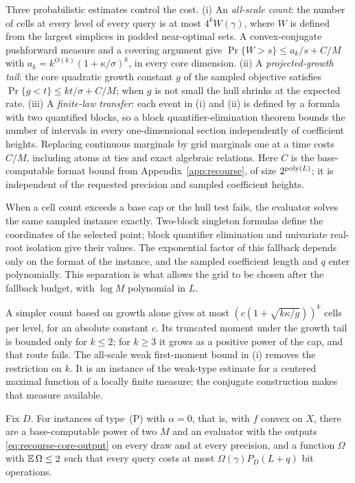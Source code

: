Three probabilistic estimates control the cost. (i) An
\emph{all-scale count}: the number of cells at every level of every
query is at most $4^kW(\gamma)$, where $W$ is defined from the
largest simplices in padded near-optimal sets. A convex-conjugate
pushforward measure and a covering argument give
$\Pr\{W>s\}\le a_k/s+C/M$ with $a_k=k^{O(k)}(1+\kappa/\sigma)^k$, in
every core dimension. (ii) A \emph{projected-growth tail}: the core
quadratic growth constant $g$ of the sampled objective satisfies
$\Pr\{g<t\}\le kt/\sigma+C/M$; when $g$ is not small the hull shrinks
at the expected rate. (iii) A \emph{finite-law transfer}: each event in
(i) and (ii) is defined by a formula with two quantified blocks, so a
block quantifier-elimination theorem bounds the number of intervals in
every one-dimensional section independently of coefficient heights.
Replacing continuous marginals by grid marginals one at a time costs
$C/M$, including atoms at ties and exact algebraic relations. Here $C$ is
the base-computable format bound from Appendix~\ref{app:recourse}, of size
$2^{\operatorname{poly}(L)}$; it is independent of the requested precision and sampled
coefficient heights.

When a cell count exceeds a base cap or the hull test fails, the
evaluator solves the same sampled instance exactly. Two-block singleton
formulas define the coordinates of the selected point; block
quantifier elimination and univariate real-root isolation give their
values. The exponential factor of this fallback depends only on the
format of the instance, and the sampled coefficient length and $q$
enter polynomially. This separation is what allows the grid to be
chosen after the fallback budget, with $\log M$ polynomial in $L$.

A simpler count based on growth alone gives at most
$(c(1+\sqrt{k\kappa/g}))^k$ cells per level, for an absolute constant
$c$. Its truncated moment under the growth
tail is bounded only for $k\le2$; for $k\ge3$ it grows as a positive
power of the cap, and that route fails. The all-scale weak first-moment
bound in (i) removes the restriction on $k$. It is an instance of the
weak-type estimate for a centered maximal function of a locally finite
measure; the conjugate construction makes that measure available.

\begin{corollary}
\label{cor:recourse-joint}
Fix $D$. For instances of type~(P) with $\alpha=0$, that is, with $f$
convex on $X$, there are a base-computable power of two $M$ and an
evaluator with the outputs \eqref{eq:recourse-core-output} on every
draw and at every precision, and a function $\Omega$ with
$\mathbb E\,\Omega\le2$ such that every query costs at most
$\Omega(\gamma)P_D(L+q)$ bit operations.
\end{corollary}

